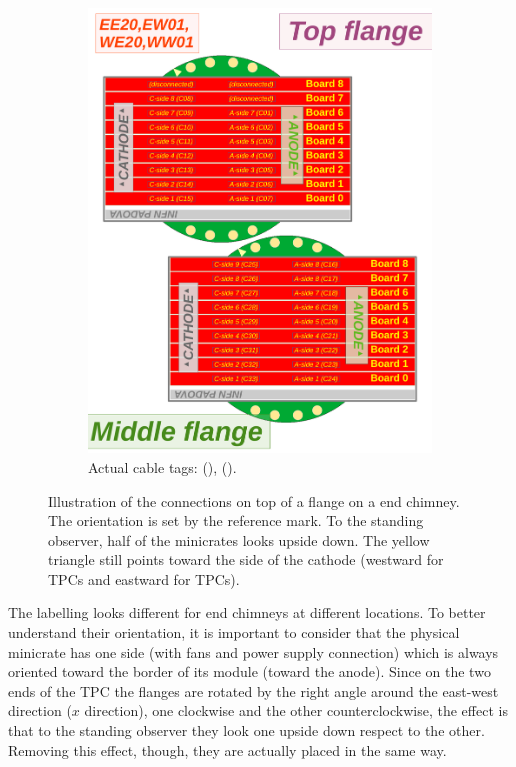 \begin{figure}
\begin{subfigure}{0.50\linewidth}
    \includegraphics[width=\textwidth]{figures/CornerFlangesAndMinicrate_downward}
    \caption{Actual cable tags:  (),  ().}
    \label{fig:FlangeConnectionsCorner_downward}
  \end{subfigure}
  \caption{
    Illustration of the connections on top of a flange on a end chimney.
    The orientation is set by the reference mark.
    To the standing observer, half of the minicrates looks upside down.
    The yellow triangle still points toward the side of the cathode
    (\ie westward for  TPCs and eastward for  TPCs).
  }
  \label{fig:FlangeConnectionsCorner}
\end{figure}

The labelling looks different for end chimneys at different locations.
To better understand their orientation,
it is important to consider that the physical minicrate has one side
(with fans and power supply connection) which is always oriented toward the border of its module (\ie toward the anode).
Since on the two ends of the TPC the flanges are rotated by the right angle around the east-west direction ($x$ direction),
one clockwise and the other counterclockwise,
the effect is that to the standing observer they look one upside down respect to the other.
Removing this effect, though, they are actually placed in the same way.



